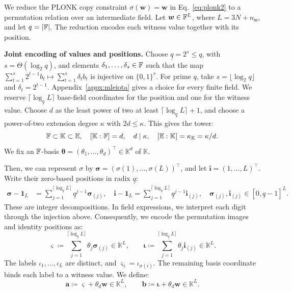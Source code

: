 We reduce the PLONK copy constraint
\(\sigma(\bm w)=\bm w\) in Eq.~\eqref{eq:plonk2} to a
permutation relation over an intermediate field.
Let \(\bm w\in{\mathbb{F}}^L\), where
\(L=3N+n_{\mathsf{io}}\), and let \(q=|{\mathbb{F}}|\).
The reduction encodes each witness value together with its
position.

\smallskip\noindent\textbf{Joint encoding of values and positions.}
Choose \(\underline q=2^s\leq q\), with
\(s=\Theta(\log_2q)\), and elements
\(\delta_1,\ldots,\delta_s\in{\mathbb{F}}\) such that the map
\(\sum_{t=1}^s2^{t-1}b_t\mapsto\sum_{t=1}^s\delta_tb_t\)
is injective on \(\{0,1\}^s\).
For prime \(q\), take \(s=\lfloor\log_2q\rfloor\) and
\(\delta_t=2^{t-1}\).
Appendix~\ref{appx:mleiota} gives a choice for every finite field.
We reserve \(\lceil\log_{\underline q} L\rceil\) base-field
coordinates for the position and one for the witness value.
Choose \(d\) as the least power of two at least
\(\lceil\log_{\underline q}L\rceil+1\), and choose a
power-of-two extension degree \(\kappa\) with \(2d\leq\kappa\).
This gives the tower:
\[
    {\mathbb{F}}\subset\mathbb K\subset\mathbb{E},
    \quad
    [\mathbb K:{\mathbb{F}}]=d,
    \quad
    d\mid\kappa,
    \quad
    [\mathbb{E}:\mathbb K]=\kappa_{\mathbb K}
       =\kappa/d.
\]
We fix an \({\mathbb{F}}\)-basis
\(\bm\theta=(\theta_1,\ldots,\theta_d)^\top\in\mathbb K^d\)
of \(\mathbb K\).

Then, we can represent \(\sigma\) by
\(\bm\sigma=(\sigma(1),\ldots,\sigma(L))^\top\), and let
\(\bm i=(1,\ldots,L)^\top\).
Write their zero-based positions in radix \(\underline{q}\):
\[
\begin{aligned}
    \bm\sigma-\bm1_L
       &=\sum_{j=1}^{\lceil\log_{\underline{q}} L\rceil}\underline q^{j-1}\bm\sigma_{(j)},
       \quad
    \bm i-\bm1_L
       =\sum_{j=1}^{\lceil\log_{\underline{q}} L\rceil}\underline q^{j-1}\bm i_{(j)},
    \quad
    \bm\sigma_{(j)},\bm i_{(j)}
       \in [0,\underline{q}-1]^L.
\end{aligned}
\]
These are integer decompositions. In field expressions, we
interpret each digit through the injection above.
Consequently,
we encode the permutation images and identity positions as:
\[
    \bm\varsigma
       \coloneqq\sum_{j=1}^{\lceil\log_{\underline q} L\rceil}\theta_j\bm\sigma_{(j)} \in \mathbb{K}^L,
    \qquad
    \bm\iota
       \coloneqq\sum_{j=1}^{\lceil\log_{\underline q} L\rceil}\theta_j\bm i_{(j)}
       \in\mathbb K^L.
\]
The labels \(\iota_1,\ldots,\iota_L\) are distinct, and
\(\varsigma_i=\iota_{\sigma(i)}\).
The remaining basis coordinate binds each label to a witness
value. We define:
\[
    \bm a\coloneqq\bm\varsigma+\theta_d \bm w  \in \mathbb{K}^L,
    \qquad
    \bm b\coloneqq\bm\iota+\theta_d\bm w
       \in\mathbb K^L.
\]

